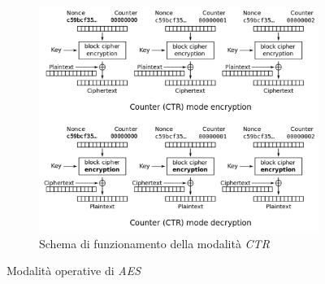 \begin{figure}[h]
\begin{subfigure}{0.48\textwidth}
        \label{fig:aes-ofb}
    \end{subfigure}
    \centering
    \begin{subfigure}{0.48\textwidth}
        \includegraphics[width=1\textwidth]{capitoli/figure-crittografia/aes-ctr.png}
        \caption{Schema di funzionamento della modalità \emph{CTR}}
        \label{fig:aes-ctr}
    \end{subfigure}
    \caption{Modalità operative di \emph{AES}}
    \label{fig:aes-modes}
\end{figure}

